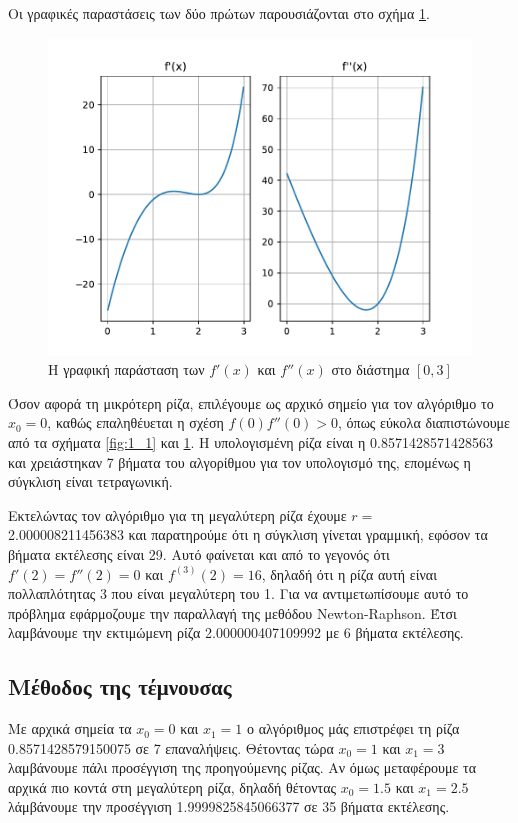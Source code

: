 \documentclass[a4paper,11pt]{article}
\newcommand{\lt}{\latintext}
\newcommand{\gt}{\greektext}
\begin{document}
Οι γραφικές παραστάσεις των δύο πρώτων παρουσιάζονται στο σχήμα \ref{fig:1_3}.

\begin{figure}[H]
    \centering
    \includegraphics[width=0.8\linewidth]{images/ask1_3.pdf}
    \caption{\gt Η γραφική παράσταση των \lt \(f'(x)\) \gt και \lt \(f''(x)\) \gt στο διάστημα \([0, 3]\)}
    \label{fig:1_3}
\end{figure}

Όσον αφορά τη μικρότερη ρίζα, επιλέγουμε ως αρχικό σημείο για τον αλγόριθμο το $x_0 = 0$, καθώς επαληθέυεται η σχέση $f(0)f''(0)>0$, όπως εύκολα διαπιστώνουμε από τα σχήματα \ref{fig:1_1} και \ref{fig:1_3}. Η υπολογισμένη ρίζα είναι η 0.8571428571428563 και χρειάστηκαν 7 βήματα του αλγορίθμου για τον υπολογισμό της, επομένως η σύγκλιση είναι τετραγωνική.

Εκτελώντας τον αλγόριθμο για τη μεγαλύτερη ρίζα έχουμε $r =$ \\ 2.000008211456383 και παρατηρούμε ότι η σύγκλιση γίνεται γραμμική, εφόσον τα βήματα εκτέλεσης είναι 29. Αυτό φαίνεται και από το γεγονός ότι \(f'(2)=f''(2)=0\) και \(f^{(3)}(2)=16\), δηλαδή ότι η ρίζα αυτή είναι πολλαπλότητας 3 που είναι μεγαλύτερη του 1. Για να αντιμετωπίσουμε αυτό το πρόβλημα εφάρμοζουμε την παραλλαγή της μεθόδου \lt Newton-Raphson. \gt Έτσι λαμβάνουμε την εκτιμώμενη ρίζα 2.000000407109992 με 6 βήματα εκτέλεσης.

\subsection{Μέθοδος της τέμνουσας}

Με αρχικά σημεία τα $x_0=0$ και $x_1=1$ ο αλγόριθμος μάς επιστρέφει τη ρίζα 0.8571428579150075 σε 7 επαναλήψεις. Θέτοντας τώρα $x_0=1$ και $x_1=3$ λαμβάνουμε πάλι προσέγγιση της προηγούμενης ρίζας. Αν όμως μεταφέρουμε τα αρχικά πιο κοντά στη μεγαλύτερη ρίζα, δηλαδή θέτοντας $x_0=1.5$ και $x_1=2.5$ λάμβάνουμε την προσέγγιση 1.9999825845066377 σε 35 βήματα εκτέλεσης.
\end{document}

